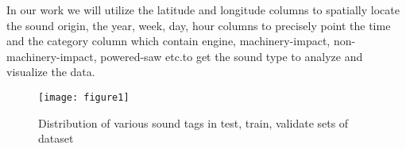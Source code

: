 In our work we will utilize the latitude and longitude columns to spatially locate the sound origin, the year, week, day, hour columns to precisely point the time and the category column which contain engine, machinery-impact, non-machinery-impact, powered-saw etc.to get the sound type to analyze and visualize the data.
	\begin{figure}[h!]
		\texttt{[image: figure1]}
		\caption{Distribution of various sound tags in test, train, validate sets of dataset}
	\end{figure}
	


	
	
	
	

	
	
